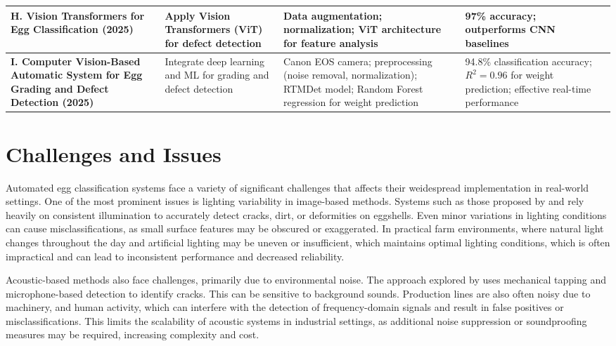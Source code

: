 \documentclass[conference]{IEEEtran}
\newcommand{\nextbreak}{\vfill\null\pagebreak}
\begin{document}
\begin{table*}[htbp]
\begin{tabular}{|p{3cm}|p{3cm}|p{3cm}|p{3cm}|p{3cm}|}
			\hline
			\textbf{H. Vision Transformers for Egg Classification (2025)} & Apply Vision Transformers (ViT) for defect detection & Data augmentation; normalization; ViT architecture for feature analysis & 97\% accuracy; outperforms CNN baselines \\
			\hline
			\textbf{I. Computer Vision-Based Automatic System for Egg Grading and Defect Detection (2025)} & Integrate deep learning and ML for grading and defect detection & Canon EOS camera; preprocessing (noise removal, normalization); RTMDet model; Random Forest regression for weight prediction & 94.8\% classification accuracy; $R^2 = 0.96$ for weight prediction; effective real-time performance \\
			\hline
		\end{tabular}
	\end{table*}
	
	\nextbreak
	
	\section{Challenges and Issues}
	
	Automated egg classification systems face a variety of significant challenges that affects their weidespread implementation in real-world settings. One of the most prominent issues is lighting variability in image-based methods. Systems such as those proposed by \cite{zhang2020cnn} and \cite{singh2022vision} rely heavily on consistent illumination to accurately detect cracks, dirt, or deformities on eggshells. Even minor variations in lighting conditions can cause misclassifications, as small surface features may be obscured or exaggerated. In practical farm environments, where natural light changes throughout the day and artificial lighting may be uneven or insufficient, which maintains optimal lighting conditions, which is often impractical and can lead to inconsistent performance and decreased reliability.
	
	Acoustic-based methods also face challenges, primarily due to environmental noise. The approach explored by \cite{wang2021acoustic} uses mechanical tapping and microphone-based detection to identify cracks. This can be sensitive to background sounds. Production lines are also often noisy due to machinery, and human activity, which can interfere with the detection of frequency-domain signals and result in false positives or misclassifications. This limits the scalability of acoustic systems in industrial settings, as additional noise suppression or soundproofing measures may be required, increasing complexity and cost.
	
\end{document}
